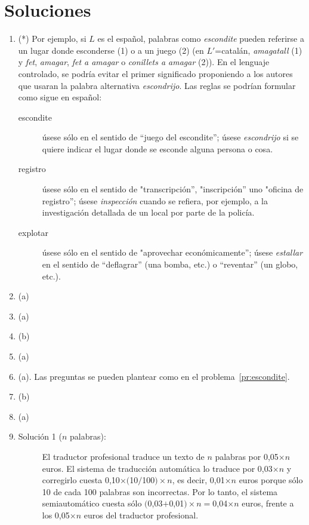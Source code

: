 \section{Soluciones} \begin{enumerate} \item(*) \label{pr:escondite} Por ejemplo, si $L$ es el español, palabras como {\em escondite} pueden referirse a un lugar donde esconderse (1) o a un juego (2) (en $L'$=catalán, \emph{amagatall} (1) y \emph{fet}, {\em amagar}, \emph{fet a amagar} o \emph{conillets a amagar} (2)). En el lenguaje controlado, se podría evitar el primer significado proponiendo a los autores que usaran la palabra alternativa {\em escondrijo}. Las reglas se podrían formular como sigue en español: {\sl \begin{description} \item[escondite] úsese sólo en el sentido de ``juego del escondite''; úsese \emph{escondrijo} si se quiere indicar el lugar donde se esconde alguna persona o cosa. \item[registro] úsese sólo en el sentido de "transcripción'', "inscripción'' uno "oficina de registro''; úsese \emph{inspección} cuando se refiera, por ejemplo, a la investigación detallada de un local por parte de la policía. \item[explotar] úsese sólo en el sentido de "aprovechar económicamente''; úsese \emph{estallar} en el sentido de ``deflagrar'' (una bomba, etc.) o ``reventar'' (un globo, etc.). \end{description} } \item (a) \item (a) \item (b) \item (a) 

\item (a). Las preguntas se pueden plantear como en el problema~\ref{pr:escondite}. \item (b) \item (a) \item

\begin{description} \item [Solución 1 ($n$ palabras):] El traductor profesional traduce un texto de $n$ palabras por 0,05$\times n$ euros. El sistema de traducción automática lo traduce por 0,03$\times n$ y corregirlo cuesta 0,10$\times($10$/$100$)\times n$, es decir, 0,01$\times n$ euros porque sólo 10 de cada 100 palabras son incorrectas. Por lo tanto, el sistema semiautomático cuesta sólo $($0,03$+$0,01$)\times n = $0,04$\times n$ euros, frente a los 0,05$\times n$ euros del traductor profesional. 


\end{description}
\end{enumerate}
